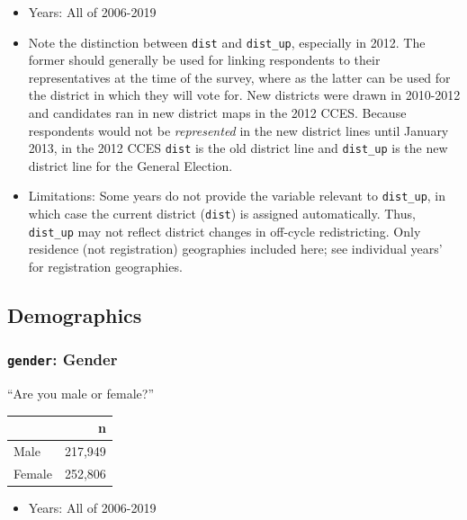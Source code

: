 \documentclass[10pt,article,oneside]{memoir}
\theoremstyle{definition}
\begin{document}
\begin{itemize}
\tightlist
\item
  Years: All of 2006-2019
\item
  Note the distinction between \texttt{dist} and \texttt{dist\_up},
  especially in 2012. The former should generally be used for linking
  respondents to their representatives at the time of the survey, where
  as the latter can be used for the district in which they will vote
  for. New districts were drawn in 2010-2012 and candidates ran in new
  district maps in the 2012 CCES. Because respondents would not be
  \emph{represented} in the new district lines until January 2013, in
  the 2012 CCES \texttt{dist} is the old district line and
  \texttt{dist\_up} is the new district line for the General Election.
\item
  Limitations: Some years do not provide the variable relevant to
  \texttt{dist\_up}, in which case the current district (\texttt{dist})
  is assigned automatically. Thus, \texttt{dist\_up} may not reflect
  district changes in off-cycle redistricting. Only residence (not
  registration) geographies included here; see individual years' for
  registration geographies.
\end{itemize}

\newpage

\hypertarget{demographics}{%
\subsection{Demographics}\label{demographics}}

\hypertarget{gender-gender}{%
\subsubsection{\texorpdfstring{\texttt{gender}:
Gender}{gender: Gender}}\label{gender-gender}}

``Are you male or female?''

\begin{table}[H]
\centering
\begin{tabular}{lr}
\toprule
 & n\\
\midrule
Male & 217,949\\
Female & 252,806\\
\bottomrule
\end{tabular}
\end{table}

\begin{itemize}
\tightlist
\item
  Years: All of 2006-2019
\end{itemize}
\end{document}
